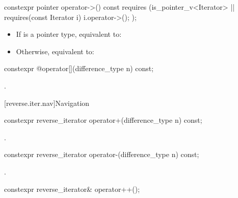 %
\begin{itemdecl}
constexpr pointer operator->() const
  requires (is_pointer_v<Iterator> ||
            requires(const Iterator i) { i.operator->(); });
\end{itemdecl}

\begin{itemdescr}
\pnum
\effects
\begin{itemize}
\item If  is a pointer type, equivalent to:

\item Otherwise, equivalent to:
\end{itemize}
\end{itemdescr}

%
\begin{itemdecl}
constexpr @\unspec@ operator[](difference_type n) const;
\end{itemdecl}

\begin{itemdescr}
\pnum
\returns
{}.
\end{itemdescr}

[reverse.iter.nav]{Navigation}

%
\begin{itemdecl}
constexpr reverse_iterator operator+(difference_type n) const;
\end{itemdecl}

\begin{itemdescr}
\pnum
\returns
{}.
\end{itemdescr}

%
\begin{itemdecl}
constexpr reverse_iterator operator-(difference_type n) const;
\end{itemdecl}

\begin{itemdescr}
\pnum
\returns
{}.
\end{itemdescr}

%
\begin{itemdecl}
constexpr reverse_iterator& operator++();
\end{itemdecl}

